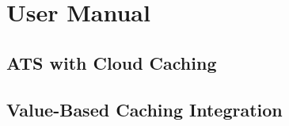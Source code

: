 \section{User Manual}

\subsection{ATS with Cloud Caching}

\subsection{Value-Based Caching Integration}